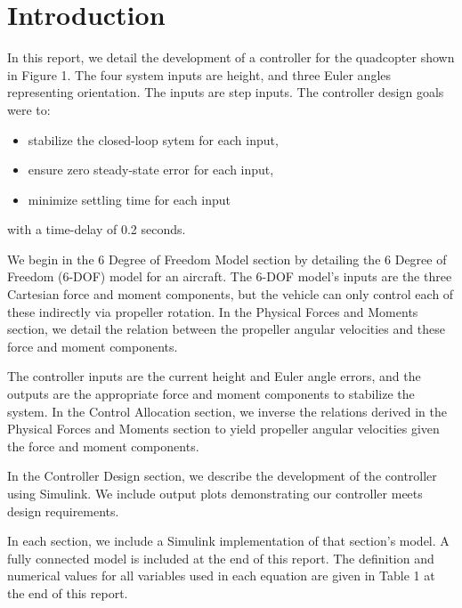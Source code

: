 \section*{Introduction}

In this report, we detail the development of a controller for the quadcopter shown in Figure 1. The four system inputs are height, and three Euler angles representing orientation. The inputs are step inputs. The controller design goals were to:
\begin{itemize}
    \item stabilize the closed-loop sytem for each input,
    \item ensure zero steady-state error for each input,
    \item minimize settling time for each input
\end{itemize}
with a time-delay of 0.2 seconds.

We begin in the 6 Degree of Freedom Model section by detailing the 6 Degree of Freedom (6-DOF) model for an aircraft. The 6-DOF model's inputs are the three Cartesian force and moment components, but the vehicle can only control each of these indirectly via propeller rotation. In the Physical Forces and Moments section, we detail the relation between the propeller angular velocities and these force and moment components.

The controller inputs are the current height and Euler angle errors, and the outputs are the appropriate force and moment components to stabilize the system. In the Control Allocation section, we inverse the relations derived in the Physical Forces and Moments section to yield propeller angular velocities given the force and moment components.

In the Controller Design section, we describe the development of the controller using Simulink. We include output plots demonstrating our controller meets design requirements.

In each section, we include a Simulink implementation of that section's model. A fully connected model is included at the end of this report. The definition and numerical values for all variables used in each equation are given in Table 1 at the end of this report.